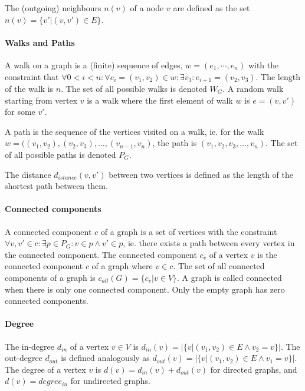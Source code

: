 The (outgoing) neighbours $n(v)$ of a node $v$ are defined as the set $n(v) = \{v' | (v, v') \in E \}$.

\paragraph{Walks and Paths}
A walk on a graph is a (finite) sequence of edges, $w = (e_1, \cdots, e_n)$ with the constraint that $\forall 0 < i < n: \forall e_i = (v_1, v_2) \in w: \exists v_3: e_{i + 1} = (v_2, v_3)$. The length of the walk is $n$.
The set of all possible walks is denoted $W_G$.
A random walk starting from vertex $v$ is a walk where the first element of walk $w$ is $e = (v, v')$ for some $v'$.

A path is the sequence of the vertices visited on a walk, ie. for the walk $w = ((v_1, v_2), (v_2, v_3), \dots, (v_{n-1}, v_n)$, the path is $(v_1, v_2, v_3, \dots, v_n)$.
The set of all possible paths is denoted $P_G$.

The distance $d_{istance}(v, v')$ between two vertices is defined as the length of the shortest path between them.

\paragraph{Connected components}
A connected component $c$ of a graph is a set of vertices with the constraint $\forall v, v' \in c: \exists p \in P_G: v \in p \land v' \in p$, ie. there exists a path between every vertex in the connected component.
The connected component $c_v$ of a vertex $v$ is the connected component $c$ of a graph where $v \in c$.
The set of all connected components of a graph is $c_{all}(G) = \{ c_v | v \in V \}$. A graph is called connected when there is only one connected component. Only the empty graph has zero connected components.

\paragraph{Degree}
The in-degree $d_{in}$ of a vertex $v \in V$ is $d_{in}(v) = |\{v | (v_1, v_2) \in E \land v_2 = v\}|$.
The out-degree $d_{out}$ is defined analogously as $d_{out}(v) = |\{v | (v_1, v_2) \in E \land v_1 = v\}|$.
The degree of a vertex $v$ is $d(v) = d_{in}(v) + d_{out}(v)$ for directed graphs, and $d(v) = degree_{in}$ for undirected graphs.

